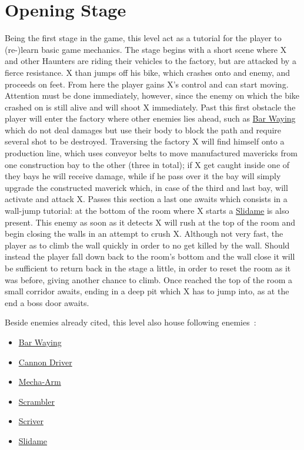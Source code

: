\section{Opening Stage}
Being the first stage in the game, this level act as a tutorial for the player to (re-)learn basic game mechanics. The stage begins with a short scene where X and other Haunters are riding their vehicles to the factory, but are attacked by a fierce resistance. X than jumps off his bike, which crashes onto and enemy, and proceeds on feet. From here the player gains X's control and can start moving. Attention must be done immediately, however, since the enemy on which the bike crashed on is still alive and will shoot X immediately. Past this first obstacle the player will enter the factory where other enemies lies ahead, such as \hyperlink{enem:Bar_Waying}{Bar Waying} which do not deal damages but use their body to block the path and require several shot to be destroyed. Traversing the factory X will find himself onto a production line, which uses conveyor belts to move manufactured mavericks from one construction bay to the other (three in total); if X get caught inside one of they bays he will receive damage, while if he pass over it the bay will simply upgrade the constructed maverick which, in case of the third and last bay, will activate and attack X. Passes this section a last one awaits which consists in a wall-jump tutorial: at the bottom of the room where X starts a \hyperlink{enem:Slidame}{Slidame} is also present. This enemy as soon as it detects X will rush at the top of the room and begin closing the walls in an attempt to crush X. Although not very fast, the player as to climb the wall quickly in  order to no get killed by the wall. Should instead the player fall down back to the room's bottom and the wall close it will be sufficient to return back in the stage a little, in order to reset the room as it was before, giving another chance to climb. Once reached the top of the room a small corridor awaits, ending in a deep pit which X has to jump into, as at the end a boss door awaits.

Beside enemies already cited, this level also house following enemies~\cite{wiki:X2_opening}:
\begin{itemize}
	\item \hyperlink{enem:Bar_Waying}{Bar Waying}
	\item \hyperlink{enem:Cannon_Driver}{Cannon Driver}
	\item \hyperlink{enem:Mecha-Arm}{Mecha-Arm}
	\item \hyperlink{enem:Scrambler}{Scrambler}
	\item \hyperlink{enem:Scriver}{Scriver}
	\item \hyperlink{enem:Slidame}{Slidame}
\end{itemize}

